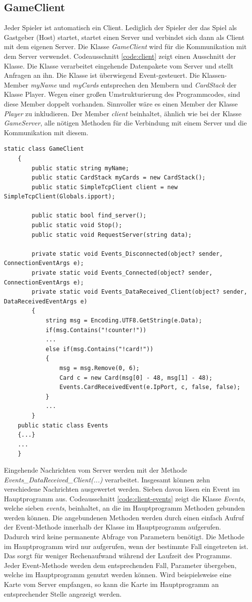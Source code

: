 \subsection{GameClient}
Jeder Spieler ist automatisch ein Client. Lediglich der Spieler der das Spiel als Gastgeber (Host) startet, startet einen Server und verbindet sich dann als Client mit dem eigenen Server. Die Klasse \textit{GameClient} wird für die Kommunikation mit dem Server verwendet. Codeausschnitt \ref{code:client} zeigt einen Ausschnitt der Klasse. Die Klasse verarbeitet eingehende Datenpakete vom Server und stellt Anfragen an ihn. Die Klasse ist überwiegend Event-gesteuert. Die Klassen-Member \textit{myName} und \textit{myCards} entsprechen den Membern  und \textit{CardStack} der Klasse Player. Wegen einer großen Umstrukturierung des Programmcodes, sind diese Member doppelt vorhanden. Sinnvoller wäre es einen Member der Klasse \textit{Player} zu inkludieren. Der Member \textit{client} beinhaltet, ähnlich wie bei der Klasse \textit{GameServer}, alle nötigen Methoden für die Verbindung mit einem Server und die Kommunikation mit diesem.
\begin{lstlisting}[label=code:client, caption={Codeausschnitt Klasse GameClient}]
 	static class GameClient
	{
		public static string myName;
		public static CardStack myCards = new CardStack();
		public static SimpleTcpClient client = new SimpleTcpClient(Globals.ipport);
		
		public static bool find_server();
		public static void Stop();
		public static void RequestServer(string data);
		
		private static void Events_Disconnected(object? sender, ConnectionEventArgs e);
		private static void Events_Connected(object? sender, ConnectionEventArgs e);
		private static void Events_DataReceived_Client(object? sender, DataReceivedEventArgs e)
		{
			string msg = Encoding.UTF8.GetString(e.Data);
			if(msg.Contains("!counter!"))
			...
			else if(msg.Contains("!card!"))
			{
				msg = msg.Remove(0, 6);
				Card c = new Card(msg[0] - 48, msg[1] - 48);
				Events.CardReceivedEvent(e.IpPort, c, false, false);
			}
			...
		}
	public static class Events
	{...}
	...
	}
\end{lstlisting}
Eingehende Nachrichten vom Server werden mit der Methode \textit{Events\_DataReceived\_Client(...)} verarbeitet. Insgesamt können zehn verschiedene Nachrichten ausgewertet werden. Sieben davon lösen ein Event im Hauptprogramm aus. Codeausschnitt \ref{code:client-events} zeigt die Klasse \textit{Events}, welche sieben \textit{events}, beinhaltet, an die im Hauptprogramm Methoden gebunden werden können. Die angebundenen Methoden werden durch einen einfach Aufruf der Event-Methode innerhalb der Klasse im Hauptprogramm aufgerufen. Dadurch wird keine permanente Abfrage von Parametern benötigt. Die Methode im Hauptprogramm wird nur aufgerufen, wenn der bestimmte Fall eingetreten ist. Das sorgt für weniger Rechenaufwand während der Laufzeit des Programms. Jeder Event-Methode werden dem entsprechenden Fall, Parameter übergeben, welche im Hauptprogramm genutzt werden können. Wird beispielsweise eine Karte vom Server empfangen, so kann die Karte im Hauptprogramm an entsprechender Stelle angezeigt werden. 
